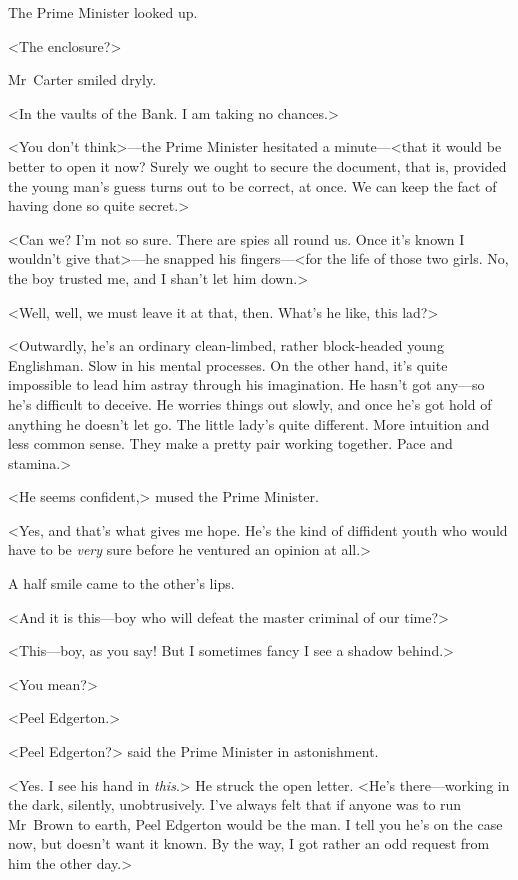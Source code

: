 The Prime Minister looked up.

<The enclosure?>

Mr~Carter smiled dryly.

<In the vaults of the Bank. I am taking no chances.>

<You don't think>—the Prime Minister hesitated a minute—<that it would be better to open it now? Surely we ought to secure the document, that is, provided the young man's guess turns out to be correct, at once. We can keep the fact of having done so quite secret.>

<Can we? I'm not so sure. There are spies all round us. Once it's known I wouldn't give that>—he snapped his fingers—<for the life of those two girls. No, the boy trusted me, and I shan't let him down.>

<Well, well, we must leave it at that, then. What's he like, this lad?>

<Outwardly, he's an ordinary clean-limbed, rather block-headed young Englishman. Slow in his mental processes. On the other hand, it's quite impossible to lead him astray through his imagination. He hasn't got any—so he's difficult to deceive. He worries things out slowly, and once he's got hold of anything he doesn't let go. The little lady's quite different. More intuition and less common sense. They make a pretty pair working together. Pace and stamina.>

<He seems confident,> mused the Prime Minister.

<Yes, and that's what gives me hope. He's the kind of diffident youth who would have to be \emph{very} sure before he ventured an opinion at all.>

A half smile came to the other's lips.

<And it is this—boy who will defeat the master criminal of our time?>

<This—boy, as you say! But I sometimes fancy I see a shadow behind.>

<You mean?>

<Peel Edgerton.>

<Peel Edgerton?> said the Prime Minister in astonishment.

<Yes. I see his hand in \emph{this}.> He struck the open letter. <He's there—working in the dark, silently, unobtrusively. I've always felt that if anyone was to run Mr~Brown to earth, Peel Edgerton would be the man. I tell you he's on the case now, but doesn't want it known. By the way, I got rather an odd request from him the other day.>

